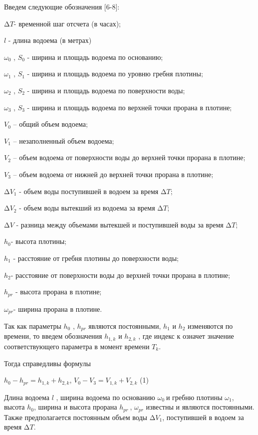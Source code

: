 \begin{multicols}{2}
Введем следующие обозначения {[}6-8{]}:

\(\mathrm{\Delta}T\)- временной шаг отсчета (в часах);

\(l\) - длина водоема (в метрах)

\(\omega_{0}\) , \(S_{0}\) - ширина и площадь водоема по основанию;

\(\omega_{1}\) , \(S_{1}\) - ширина и площадь водоема по уровню гребня
плотины;

\(\omega_{2}\) , \(S_{2}\) - ширина и площадь водоема по поверхности
воды;

\(\omega_{3}\) , \(S_{3}\) - ширина и площадь водоема по верхней точки
прорана в плотине;

\(V_{0}\) -- общий объем водоема;

\(V_{1}\) -- незаполненный объем водоема;

\(V_{2}\) -- объем водоема от поверхности воды до верхней точки прорана
в плотине;

\(V_{3}\) -- объем водоема от нижней до верхней точки прорана в плотине;

\(\mathrm{\Delta}V_{1}\) - объем воды поступившей в водоем за время
\(\mathrm{\Delta}T\);

\(\mathrm{\Delta}V_{2}\) - объем воды вытекший из водоема за время
\(\mathrm{\Delta}T\);

\(\mathrm{\Delta}V\) - разница между объемами вытекшей и поступившей
воды за время \(\mathrm{\Delta}T\);

\(h_{0}\)- высота плотины;

\(h_{1}\) - расстояние от гребня плотины до поверхности воды;

\(h_{2}\)- расстояние от поверхности воды до верхней точки прорана в
плотине;

\(h_{pr}\) - высота прорана в плотине;

\(\omega_{pr}\)- ширина прорана в плотине.

Так как параметры \(h_{0}\) , \(h_{pr}\) являются постоянными, \(h_{1}\)
и \(h_{2}\) изменяются по времени, то введем обозначения \(h_{1,k}\) и
\(h_{2,k}\) , где индекс к означет значение соответствующего параметра в
момент времени \(T_{k}\).

Тогда справедливы формулы

\(h_{0} - h_{pr} = h_{1,k} + h_{2,k}\),
\(V_{0} - V_{3} = V_{1,k} + V_{2,k}\) (1)

Длина водоема \(l\) , ширина водоема по основанию \(\omega_{0}\ \)и
гребню плотины \(\omega_{1}\), высота \(h_{0}\), ширина и высота прорана
\(h_{pr}\ \), \(\omega_{pr}\) известны и являются постоянными. Также
предполагается постоянным объем воды \(\mathrm{\Delta}V_{1}\),
поступившей в водоем за время \(\mathrm{\Delta}T\).


\end{multicols}
